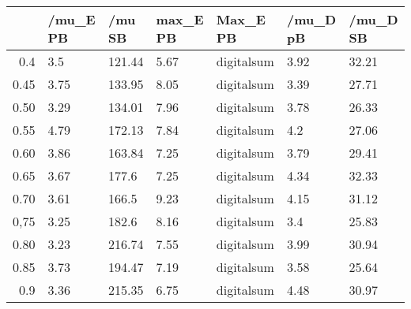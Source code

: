 \begin{table}[ht]
\centering
\begin{tabular}{rllllll}
  \hline
 & /mu\_E PB & /mu SB & max\_E PB & Max\_E PB & /mu\_D pB & /mu\_D SB \\ 
  \hline
0.4 & 3.5 & 121.44 & 5.67 & digitalsum & 3.92 & 32.21 \\ 
  0.45 & 3.75 & 133.95 & 8.05 & digitalsum & 3.39 & 27.71 \\ 
  0.50 & 3.29 & 134.01 & 7.96 & digitalsum & 3.78 & 26.33 \\ 
  0.55 & 4.79 & 172.13 & 7.84 & digitalsum & 4.2 & 27.06 \\ 
  0.60 & 3.86 & 163.84 & 7.25 & digitalsum & 3.79 & 29.41 \\ 
  0.65 & 3.67 & 177.6 & 7.25 & digitalsum & 4.34 & 32.33 \\ 
  0.70 & 3.61 & 166.5 & 9.23 & digitalsum & 4.15 & 31.12 \\ 
  0,75 & 3.25 & 182.6 & 8.16 & digitalsum & 3.4 & 25.83 \\ 
  0.80 & 3.23 & 216.74 & 7.55 & digitalsum & 3.99 & 30.94 \\ 
  0.85 & 3.73 & 194.47 & 7.19 & digitalsum & 3.58 & 25.64 \\ 
  0.9 & 3.36 & 215.35 & 6.75 & digitalsum & 4.48 & 30.97 \\ 
   \hline
\end{tabular}
\end{table}
